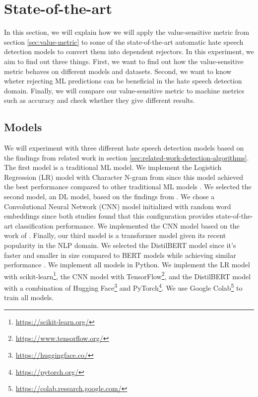 \section{State-of-the-art}
\label{sec:state-of-the-art}
In this section, we will explain how we will apply the value-sensitive metric from section \ref{sec:value-metric} to some of the state-of-the-art automatic hate speech detection models to convert them into dependent rejectors.
%
In this experiment, we aim to find out three things.
%
First, we want to find out how the value-sensitive metric behaves on different models and datasets.
%
Second, we want to know wheter rejecting ML predictions can be beneficial in the hate speech detection domain.
%
Finally, we will compare our value-sensitive metric to machine metrics such as accuracy and check whether they give different results.
%

\subsection{Models}
We will experiment with three different hate speech detection models based on the findings from related work in section \ref{sec:related-work-detection-algorithms}.
%
The first model is a traditional ML model.
%
We implement the Logistich Regression (LR) model with Character N-gram from \citet{waseem2016hateful} since this model achieved the best performance compared to other traditional ML models \citep{davidson2017automated}.
%
We selected the second model, an DL model, based on the findings from \citet{agrawal2018deep, badjatiya2017deep}.
%
We chose a Convolutional Neural Network (CNN) model initialized with random word embeddings since both studies found that this configuration provides state-of-the-art classification performance.
%
We implemented the CNN model based on the work of \citep{agrawal2018deep}.
%
Finally, our third model is a transformer model given its recent popularity in the NLP domain.
%
We selected the DistilBERT model since it's faster and smaller in size compared to BERT models while achieving similar performance \citep{sanh2019distilbert}.
%
We implement all models in Python.
%
We implement the LR model with scikit-learn\footnote{\url{https://scikit-learn.org/}}, the CNN model with TensorFlow\footnote{\url{https://www.tensorflow.org/}}, and the DistilBERT model with a combination of Hugging Face\footnote{\url{https://huggingface.co/}} and PyTorch\footnote{\url{https://pytorch.org/}}.
%
We use Google Colab\footnote{\url{https://colab.research.google.com/}} to train all models.

